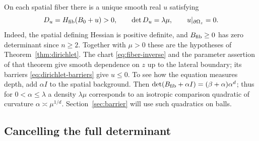 On each spatial fiber there is a unique smooth real $u$ satisfying
\begin{equation}\label{eq:fiber-equation}
 D_u=H_{\rm fib}(B_0+u)>0,\qquad
 \det D_u=\lambda\mu,\qquad u|_{\partial\Omega_z}=0 .
\end{equation}
Indeed, the spatial defining Hessian is positive definite, and
$B_{\rm fib}\ge0$ has zero determinant since $n\ge2$. Together with
$\mu>0$ these are the hypotheses of Theorem~\ref{thm:dirichlet}.
The chart \eqref{eq:fiber-inverse} and the parameter assertion of that
theorem give smooth dependence on $z$ up to the lateral boundary;
its barriers \eqref{eq:dirichlet-barriers} give $u\le0$.
To see how the equation measures depth, add $\alpha I$ to the spatial
background. Then
$\det(B_{\rm fib}+\alpha I)=(\beta+\alpha)\alpha^d$; thus for
$0<\alpha\le\lambda$ a density $\lambda\mu$ corresponds to an
isotropic comparison quadratic of curvature $\alpha\asymp\mu^{1/d}$.
Section~\ref{sec:barrier} will use such quadratics on balls.

\subsection{Cancelling the full determinant}

